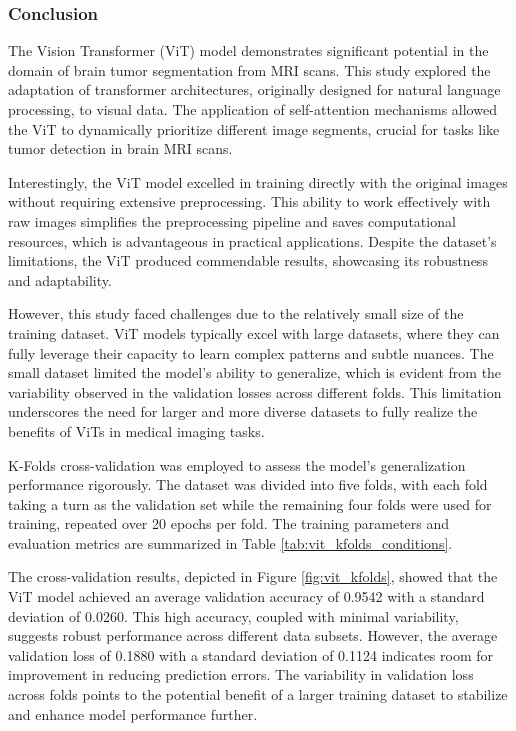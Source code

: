 \subsubsection{Conclusion}

The Vision Transformer (ViT) model demonstrates significant potential in the domain of brain tumor segmentation from MRI scans. This study explored the adaptation of transformer architectures, originally designed for natural language processing, to visual data. The application of self-attention mechanisms allowed the ViT to dynamically prioritize different image segments, crucial for tasks like tumor detection in brain MRI scans.

Interestingly, the ViT model excelled in training directly with the original images without requiring extensive preprocessing. This ability to work effectively with raw images simplifies the preprocessing pipeline and saves computational resources, which is advantageous in practical applications. Despite the dataset's limitations, the ViT produced commendable results, showcasing its robustness and adaptability.

However, this study faced challenges due to the relatively small size of the training dataset. ViT models typically excel with large datasets, where they can fully leverage their capacity to learn complex patterns and subtle nuances. The small dataset limited the model's ability to generalize, which is evident from the variability observed in the validation losses across different folds. This limitation underscores the need for larger and more diverse datasets to fully realize the benefits of ViTs in medical imaging tasks.

K-Folds cross-validation was employed to assess the model's generalization performance rigorously. The dataset was divided into five folds, with each fold taking a turn as the validation set while the remaining four folds were used for training, repeated over 20 epochs per fold. The training parameters and evaluation metrics are summarized in Table \ref{tab:vit_kfolds_conditions}.

The cross-validation results, depicted in Figure \ref{fig:vit_kfolds}, showed that the ViT model achieved an average validation accuracy of 0.9542 with a standard deviation of 0.0260. This high accuracy, coupled with minimal variability, suggests robust performance across different data subsets. However, the average validation loss of 0.1880 with a standard deviation of 0.1124 indicates room for improvement in reducing prediction errors. The variability in validation loss across folds points to the potential benefit of a larger training dataset to stabilize and enhance model performance further.

